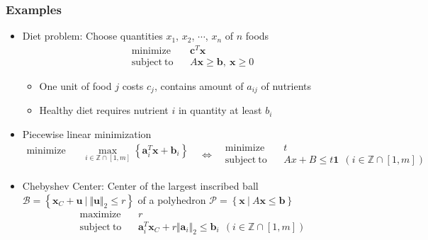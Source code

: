 \subsubsection*{Examples}
\begin{itemize}
    \item Diet problem: Choose quantities $x_1$, $x_2$, $\cdots$, $x_n$ of $n$ foods
    \begin{equation}\begin{aligned}
        \mathrm{minimize}~~&~~\mathbf{c}^T \mathbf{x} \\
        \mathrm{subject~to}~~&~~A\mathbf{x} \geq \mathbf{b},~\mathbf{x} \geq 0
    \end{aligned}\end{equation}
    \begin{itemize}
        \item One unit of food $j$ costs $c_j$, contains amount of $a_{ij}$ of nutrients
        \item Healthy diet requires nutrient $i$ in quantity at least $b_i$
    \end{itemize}
    \item Piecewise linear minimization
    \begin{equation}\begin{aligned}
        \mathrm{minimize}~~&~~\max_{i \in \mathbb{Z} \cap [1,m]} \left\{ \mathbf{a}_i^T\mathbf{x} + \mathbf{b}_i \right\} \\ {}
    \end{aligned}~~~\Leftrightarrow~~~\begin{aligned}
        \mathrm{minimize}~~&~~t \\
        \mathrm{subject~to}~~&~~Ax + B \leq t\mathbf{1}~~(i \in \mathbb{Z} \cap [1,m])
    \end{aligned}\end{equation}
    \item Chebyshev Center: Center of the largest inscribed ball $\mathcal{B} = \left\{\mathbf{x}_C+\mathbf{u}~|~\Vert\mathbf{u}\Vert_2\leq r \right\}$
        of a polyhedron $\mathcal{P} = \left\{\mathbf{x}~|~A\mathbf{x}\leq\mathbf{b} \right\}$
    \begin{equation}\begin{aligned}
        \mathrm{maximize}~~&~~r \\
        \mathrm{subject~to}~~&~~\mathbf{a}_i^T \mathbf{x}_C + r\Vert\mathbf{a}_i\Vert_2\leq\mathbf{b}_i~~(i \in \mathbb{Z} \cap [1,m])
    \end{aligned}\end{equation}
\end{itemize}

